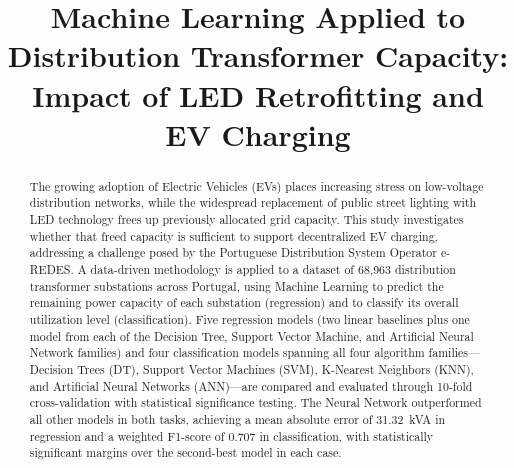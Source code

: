 \documentclass[conference]{IEEEtran}
\begin{document}
\title{Machine Learning Applied to Distribution Transformer Capacity: Impact of LED Retrofitting and EV Charging}

\author{
\and
{}
\and
{}
}

\maketitle

\begin{abstract}
The growing adoption of Electric Vehicles (EVs) places increasing stress on low-voltage distribution networks, while the widespread replacement of public street lighting with LED technology frees up previously allocated grid capacity. This study investigates whether that freed capacity is sufficient to support decentralized EV charging, addressing a challenge posed by the Portuguese Distribution System Operator e-REDES. A data-driven methodology is applied to a dataset of 68,963 distribution transformer substations across Portugal, using Machine Learning to predict the remaining power capacity of each substation (regression) and to classify its overall utilization level (classification). Five regression models (two linear baselines plus one model from each of the Decision Tree, Support Vector Machine, and Artificial Neural Network families) and four classification models spanning all four algorithm families---Decision Trees (DT), Support Vector Machines (SVM), K-Nearest Neighbors (KNN), and Artificial Neural Networks (ANN)---are compared and evaluated through 10-fold cross-validation with statistical significance testing. The Neural Network outperformed all other models in both tasks, achieving a mean absolute error of 31.32~kVA in regression and a weighted F1-score of 0.707 in classification, with statistically significant margins over the second-best model in each case.
\end{abstract}
\end{document}

